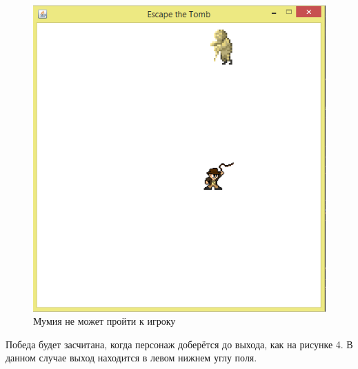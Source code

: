 \documentclass[a4paper]{article}
\begin{document}
\begin{figure}[H]
	\begin{center}
		\includegraphics[scale=0.7]{image/field2.png}
		\caption{Мумия не может пройти к игроку} 
		\label{pic:pic_name} %
	\end{center}
\end{figure}

Победа будет засчитана, когда персонаж доберётся до выхода, как на рисунке 4. В данном случае выход находится в левом нижнем углу поля. 
\end{document}
